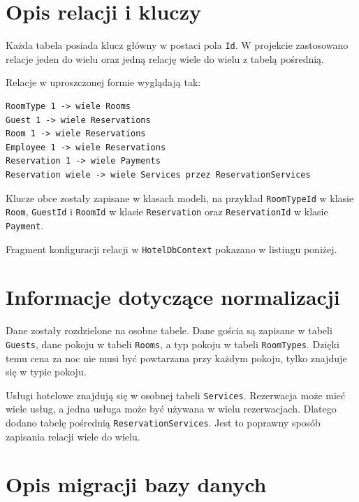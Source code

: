 \section{Opis relacji i kluczy}

Każda tabela posiada klucz główny w postaci pola \texttt{Id}. W projekcie zastosowano relacje jeden do wielu oraz jedną relację wiele do wielu z tabelą pośrednią.

Relacje w uproszczonej formie wyglądają tak:

\begin{lstlisting}[style=textStyle,caption={Relacje w bazie danych},label={lst:relacje}]
RoomType 1 -> wiele Rooms
Guest 1 -> wiele Reservations
Room 1 -> wiele Reservations
Employee 1 -> wiele Reservations
Reservation 1 -> wiele Payments
Reservation wiele -> wiele Services przez ReservationServices
\end{lstlisting}

Klucze obce zostały zapisane w klasach modeli, na przykład \texttt{RoomTypeId} w klasie \texttt{Room}, \texttt{GuestId} i \texttt{RoomId} w klasie \texttt{Reservation} oraz \texttt{ReservationId} w klasie \texttt{Payment}.

Fragment konfiguracji relacji w \texttt{HotelDbContext} pokazano w listingu poniżej.



\section{Informacje dotyczące normalizacji}

Dane zostały rozdzielone na osobne tabele. Dane gościa są zapisane w tabeli \texttt{Guests}, dane pokoju w tabeli \texttt{Rooms}, a typ pokoju w tabeli \texttt{RoomTypes}. Dzięki temu cena za noc nie musi być powtarzana przy każdym pokoju, tylko znajduje się w typie pokoju.

Usługi hotelowe znajdują się w osobnej tabeli \texttt{Services}. Rezerwacja może mieć wiele usług, a jedna usługa może być używana w wielu rezerwacjach. Dlatego dodano tabelę pośrednią \texttt{ReservationServices}. Jest to poprawny sposób zapisania relacji wiele do wielu.

\section{Opis migracji bazy danych}

